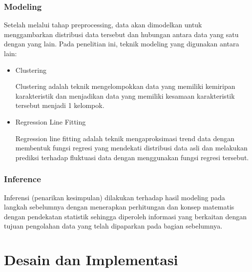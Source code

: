 \documentclass{article}
\begin{document}
\subsubsection{Modeling}
\begin{adjustwidth}{4em}{0pt}
	
\hspace{\parindent}Setelah melalui tahap preprocessing, data akan dimodelkan untuk menggambarkan distribusi data tersebut dan hubungan antara data yang satu dengan yang lain. Pada penelitian ini, teknik modeling yang digunakan antara lain: 

\begin{itemize}
	\item{Clustering}
	
	Clustering adalah teknik mengelompokkan data yang memiliki kemiripan karakteristik dan menjadikan data yang memiliki kesamaan karakteristik tersebut menjadi 1 kelompok.
	
	\item{Regression Line Fitting}
	
	Regression line fitting adalah teknik mengaproksimasi trend data dengan membentuk fungsi regresi yang mendekati distribusi data asli dan melakukan prediksi terhadap fluktuasi data dengan menggunakan fungsi regresi tersebut.
	
\end{itemize}

\end{adjustwidth}

\subsubsection{Inference}

\begin{adjustwidth}{4em}{0pt}
	
\hspace{\parindent}Inferensi (penarikan kesimpulan) dilakukan terhadap hasil modeling pada langkah sebelumnya dengan menerapkan perhitungan dan konsep matematis dengan pendekatan statistik sehingga diperoleh informasi yang berkaitan dengan tujuan pengolahan data yang telah dipaparkan pada bagian sebelumnya.

\end{adjustwidth}

\section{Desain dan Implementasi}
\end{document}
